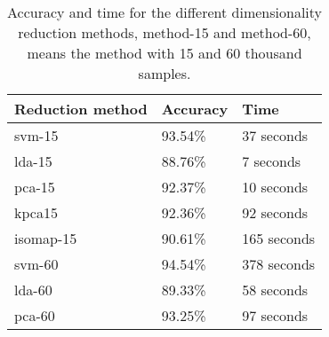 \begin{table}
    \centering
    \begin{tabular}{lll}
        \hline
        Reduction method & Accuracy & Time        \\
        \hline
        \gls{svm}-15     & 93.54\%  & 37 seconds  \\
        \gls{lda}-15     & 88.76\%  & 7 seconds   \\
        \gls{pca}-15     & 92.37\%  & 10 seconds  \\
        \gls{kpca}15     & 92.36\%  & 92 seconds  \\
        \gls{isomap}-15  & 90.61\%  & 165 seconds \\[8pt]
        \gls{svm}-60     & 94.54\%  & 378 seconds \\
        \gls{lda}-60     & 89.33\%  & 58 seconds  \\
        \gls{pca}-60     & 93.25\%  & 97 seconds  \\
        \hline
    \end{tabular}
    \caption{Accuracy and time for the different dimensionality reduction methods,  method-15 and method-60, means the method with 15 and 60 thousand samples.}
    \label{tab:discussion-experiment-1-accuracy}
\end{table}